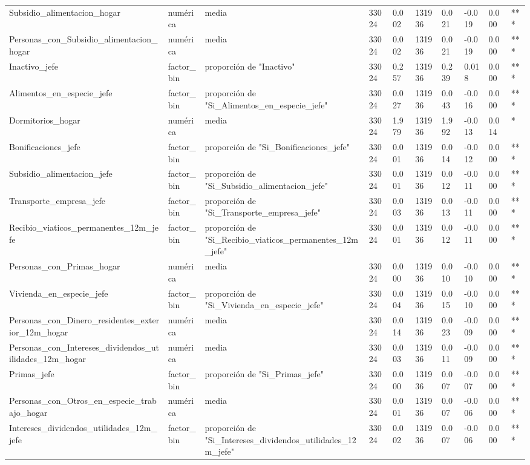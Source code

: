 \begin{longtable}[t]{llllllllll}
Subsidio\_alimentacion\_hogar & numérica & media & 33024 & 0.002 & 131936 & 0.021 & -0.019 & 0.000 & ***\\
Personas\_con\_Subsidio\_alimentacion\_hogar & numérica & media & 33024 & 0.002 & 131936 & 0.021 & -0.019 & 0.000 & ***\\
Inactivo\_jefe & factor\_bin & proporción de "Inactivo" & 33024 & 0.257 & 131936 & 0.239 & 0.018 & 0.000 & ***\\
Alimentos\_en\_especie\_jefe & factor\_bin & proporción de "Si\_Alimentos\_en\_especie\_jefe" & 33024 & 0.027 & 131936 & 0.043 & -0.016 & 0.000 & ***\\
Dormitorios\_hogar & numérica & media & 33024 & 1.979 & 131936 & 1.992 & -0.013 & 0.014 & *\\
Bonificaciones\_jefe & factor\_bin & proporción de "Si\_Bonificaciones\_jefe" & 33024 & 0.001 & 131936 & 0.014 & -0.012 & 0.000 & ***\\
Subsidio\_alimentacion\_jefe & factor\_bin & proporción de "Si\_Subsidio\_alimentacion\_jefe" & 33024 & 0.001 & 131936 & 0.012 & -0.011 & 0.000 & ***\\
Transporte\_empresa\_jefe & factor\_bin & proporción de "Si\_Transporte\_empresa\_jefe" & 33024 & 0.003 & 131936 & 0.013 & -0.011 & 0.000 & ***\\
Recibio\_viaticos\_permanentes\_12m\_jefe & factor\_bin & proporción de "Si\_Recibio\_viaticos\_permanentes\_12m\_jefe" & 33024 & 0.001 & 131936 & 0.012 & -0.011 & 0.000 & ***\\
Personas\_con\_Primas\_hogar & numérica & media & 33024 & 0.000 & 131936 & 0.010 & -0.010 & 0.000 & ***\\
Vivienda\_en\_especie\_jefe & factor\_bin & proporción de "Si\_Vivienda\_en\_especie\_jefe" & 33024 & 0.004 & 131936 & 0.015 & -0.010 & 0.000 & ***\\
Personas\_con\_Dinero\_residentes\_exterior\_12m\_hogar & numérica & media & 33024 & 0.014 & 131936 & 0.023 & -0.009 & 0.000 & ***\\
Personas\_con\_Intereses\_dividendos\_utilidades\_12m\_hogar & numérica & media & 33024 & 0.003 & 131936 & 0.011 & -0.009 & 0.000 & ***\\
Primas\_jefe & factor\_bin & proporción de "Si\_Primas\_jefe" & 33024 & 0.000 & 131936 & 0.007 & -0.007 & 0.000 & ***\\
Personas\_con\_Otros\_en\_especie\_trabajo\_hogar & numérica & media & 33024 & 0.001 & 131936 & 0.007 & -0.006 & 0.000 & ***\\
Intereses\_dividendos\_utilidades\_12m\_jefe & factor\_bin & proporción de "Si\_Intereses\_dividendos\_utilidades\_12m\_jefe" & 33024 & 0.002 & 131936 & 0.007 & -0.006 & 0.000 & ***\\

\end{longtable}

